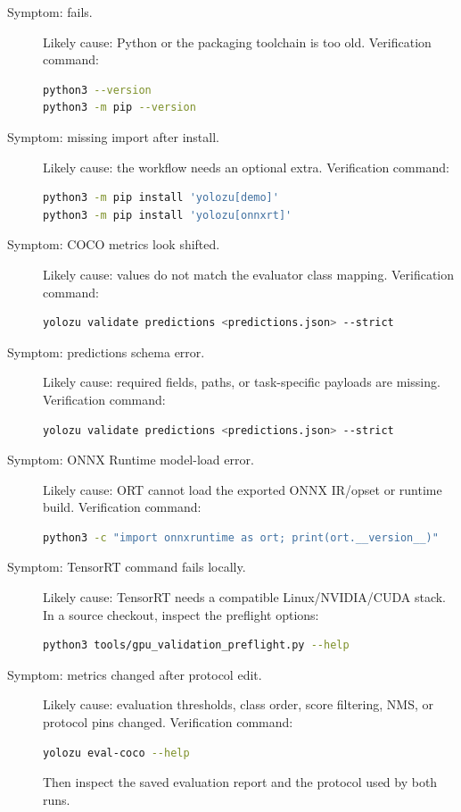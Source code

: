 \begin{description}
  \item[Symptom:  fails.] Likely cause: Python or the
  packaging toolchain is too old. Verification command:
\begin{lstlisting}[language=bash]
python3 --version
python3 -m pip --version
\end{lstlisting}

  \item[Symptom: missing import after install.] Likely cause: the workflow needs
  an optional extra. Verification command:
\begin{lstlisting}[language=bash]
python3 -m pip install 'yolozu[demo]'
python3 -m pip install 'yolozu[onnxrt]'
\end{lstlisting}

  \item[Symptom: COCO metrics look shifted.] Likely cause: 
  values do not match the evaluator class mapping. Verification command:
\begin{lstlisting}[language=bash]
yolozu validate predictions <predictions.json> --strict
\end{lstlisting}

  \item[Symptom: predictions schema error.] Likely cause: required fields,
  paths, or task-specific payloads are missing. Verification command:
\begin{lstlisting}[language=bash]
yolozu validate predictions <predictions.json> --strict
\end{lstlisting}

  \item[Symptom: ONNX Runtime model-load error.] Likely cause: ORT cannot load
  the exported ONNX IR/opset or runtime build. Verification command:
\begin{lstlisting}[language=bash]
python3 -c "import onnxruntime as ort; print(ort.__version__)"
\end{lstlisting}

  \item[Symptom: TensorRT command fails locally.] Likely cause: TensorRT needs a
  compatible Linux/NVIDIA/CUDA stack. In a source checkout, inspect the preflight options:
\begin{lstlisting}[language=bash]
python3 tools/gpu_validation_preflight.py --help
\end{lstlisting}

  \item[Symptom: metrics changed after protocol edit.] Likely cause: evaluation
  thresholds, class order, score filtering, NMS, or protocol pins changed.
  Verification command:
\begin{lstlisting}[language=bash]
yolozu eval-coco --help
\end{lstlisting}
  Then inspect the saved evaluation report and the protocol used by both runs.
\end{description}

